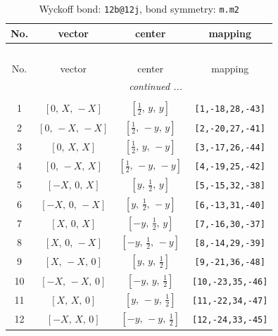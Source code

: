 \documentclass[fleqn,8pt]{jsarticle}
\begin{document}
\renewcommand{\arraystretch}{1.2}
\begin{longtable}{cccc}
\caption{Wyckoff bond: {\tt 12b@12j}, bond symmetry: {\tt m.m2}}
 \\
 \hline \hline
No. & vector & center & mapping \\ \hline \endfirsthead

\multicolumn{3}{l}{\tablename\ \thetable{}} \\
 \hline \hline
No. & vector & center & mapping \\ \hline \endhead

 \hline \hline
\multicolumn{3}{r}{\footnotesize\it continued ...} \\ \endfoot

 \hline \hline
\multicolumn{3}{r}{} \\ \endlastfoot

1 & $\left[ 0,\, X,\, - X \right]$ & $\left[ \frac{1}{2},\, y,\, y \right]$ & {\tt [1,-18,28,-43]} \\ \hline
2 & $\left[ 0,\, - X,\, - X \right]$ & $\left[ \frac{1}{2},\, - y,\, y \right]$ & {\tt [2,-20,27,-41]} \\ \hline
3 & $\left[ 0,\, X,\, X \right]$ & $\left[ \frac{1}{2},\, y,\, - y \right]$ & {\tt [3,-17,26,-44]} \\ \hline
4 & $\left[ 0,\, - X,\, X \right]$ & $\left[ \frac{1}{2},\, - y,\, - y \right]$ & {\tt [4,-19,25,-42]} \\ \hline
5 & $\left[ - X,\, 0,\, X \right]$ & $\left[ y,\, \frac{1}{2},\, y \right]$ & {\tt [5,-15,32,-38]} \\ \hline
6 & $\left[ - X,\, 0,\, - X \right]$ & $\left[ y,\, \frac{1}{2},\, - y \right]$ & {\tt [6,-13,31,-40]} \\ \hline
7 & $\left[ X,\, 0,\, X \right]$ & $\left[ - y,\, \frac{1}{2},\, y \right]$ & {\tt [7,-16,30,-37]} \\ \hline
8 & $\left[ X,\, 0,\, - X \right]$ & $\left[ - y,\, \frac{1}{2},\, - y \right]$ & {\tt [8,-14,29,-39]} \\ \hline
9 & $\left[ X,\, - X,\, 0 \right]$ & $\left[ y,\, y,\, \frac{1}{2} \right]$ & {\tt [9,-21,36,-48]} \\ \hline
10 & $\left[ - X,\, - X,\, 0 \right]$ & $\left[ - y,\, y,\, \frac{1}{2} \right]$ & {\tt [10,-23,35,-46]} \\ \hline
11 & $\left[ X,\, X,\, 0 \right]$ & $\left[ y,\, - y,\, \frac{1}{2} \right]$ & {\tt [11,-22,34,-47]} \\ \hline
12 & $\left[ - X,\, X,\, 0 \right]$ & $\left[ - y,\, - y,\, \frac{1}{2} \right]$ & {\tt [12,-24,33,-45]} \\
\end{longtable}
\end{document}
